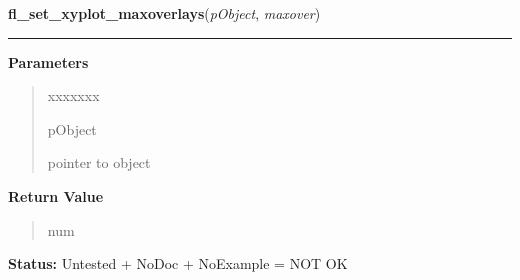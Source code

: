 \hspace{.8\funcindent}\begin{boxedminipage}{\funcwidth}

    \raggedright \textbf{fl\_set\_xyplot\_maxoverlays}(\textit{pObject}, \textit{maxover})

    \vspace{-1.5ex}

    \rule{\textwidth}{0.5\fboxrule}
\setlength{\parskip}{2ex}
\setlength{\parskip}{1ex}
      \textbf{Parameters}
      \vspace{-1ex}

      \begin{quote}
        \begin{Ventry}{xxxxxxx}

          \item[pObject]

          pointer to object

        \end{Ventry}

      \end{quote}

      \textbf{Return Value}
    \vspace{-1ex}

      \begin{quote}
      num

      \end{quote}

\textbf{Status:} Untested + NoDoc + NoExample = NOT OK



    \end{boxedminipage}

    \label{xformslib:library:fl_add_xyplot_overlay}

    \vspace{0.5ex}

